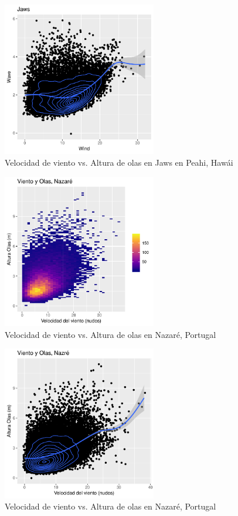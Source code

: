 \begin{figure}[H]
    \centering
    \includegraphics[width=0.6\textwidth]{./figures/jaws_smooth.pdf}
    \caption{Velocidad de viento vs. Altura de olas en Jaws en Peahi, Hawái}
    \label{fig:jaws_smooth}
\end{figure}

\begin{figure}[H]
    \centering
    \includegraphics[width=0.6\textwidth]{./figures/nazare_bin2d.pdf}
    \caption{Velocidad de viento vs. Altura de olas en Nazaré, Portugal}
    \label{fig:wind_waves_nazare}
\end{figure}

\begin{figure}[H]
    \centering
    \includegraphics[width=0.6\textwidth]{./figures/nazare_smooth.pdf}
    \caption{Velocidad de viento vs. Altura de olas en Nazaré, Portugal}
    \label{fig:nazare_smooth}
\end{figure}



